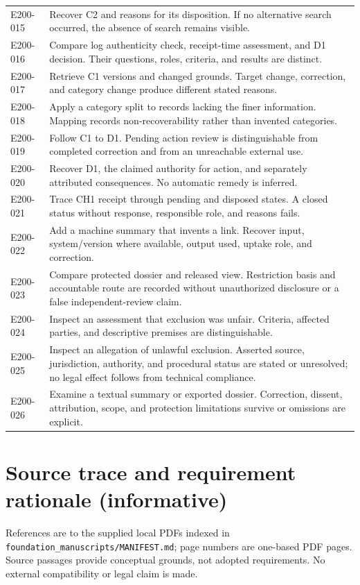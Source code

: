 \documentclass[11pt,a4paper]{article}
\begin{document}
\begin{longtable}{@{}L{0.16\textwidth}L{0.78\textwidth}@{}}
E200-015 & Recover C2 and reasons for its disposition. If no alternative search occurred, the absence of search remains visible. \\
E200-016 & Compare log authenticity check, receipt-time assessment, and D1 decision. Their questions, roles, criteria, and results are distinct. \\
E200-017 & Retrieve C1 versions and changed grounds. Target change, correction, and category change produce different stated reasons. \\
E200-018 & Apply a category split to records lacking the finer information. Mapping records non-recoverability rather than invented categories. \\
E200-019 & Follow C1 to D1. Pending action review is distinguishable from completed correction and from an unreachable external use. \\
E200-020 & Recover D1, the claimed authority for action, and separately attributed consequences. No automatic remedy is inferred. \\
E200-021 & Trace CH1 receipt through pending and disposed states. A closed status without response, responsible role, and reasons fails. \\
E200-022 & Add a machine summary that invents a link. Recover input, system/version where available, output used, uptake role, and correction. \\
E200-023 & Compare protected dossier and released view. Restriction basis and accountable route are recorded without unauthorized disclosure or a false independent-review claim. \\
E200-024 & Inspect an assessment that exclusion was unfair. Criteria, affected parties, and descriptive premises are distinguishable. \\
E200-025 & Inspect an allegation of unlawful exclusion. Asserted source, jurisdiction, authority, and procedural status are stated or unresolved; no legal effect follows from technical compliance. \\
E200-026 & Examine a textual summary or exported dossier. Correction, dissent, attribution, scope, and protection limitations survive or omissions are explicit. \\
\bottomrule
\end{longtable}

\section{Source trace and requirement rationale (informative)}
References are to the supplied local PDFs indexed in \texttt{foundation\_manuscripts/MANIFEST.md}; page numbers are one-based PDF pages. Source passages provide conceptual grounds, not adopted requirements. No external compatibility or legal claim is made.
\end{document}
